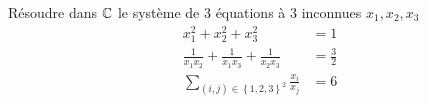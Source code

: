 R{\'e}soudre dans $\mathbb{C}$ le syst{\`e}me de 3 {\'e}quations {\`a} 3
inconnues $x_{1},x_{2},x_{3}$
\begin{align*}
x_{1}^{2}+x_{2}^{2}+x_{3}^{2} &= 1 \\
\frac{1}{x_{1}x_{2}}+\frac{1}{x_{1}x_{3}}+\frac{1}{x_{2}x_{3}} &= \frac{3}{2} \\
\sum_{(i,j)\in \left\{ 1,2,3\right\}^2 } \frac{x_{i}}{x_{j}} &= 6
\end{align*}
